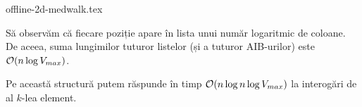 \documentclass[../main.tex]{subfiles}
\begin{document}
{offline-2d-medwalk.tex}

Să observăm că fiecare poziție apare în lista unui număr logaritmic de coloane. De aceea, suma lungimilor tuturor listelor (și a tuturor AIB-urilor) este $\mathcal{O}(n \log V_{max})$.

Pe această structură putem răspunde în timp $\mathcal{O}(n \log n \log V_{max})$ la interogări de al $k$-lea element.
\end{document}
